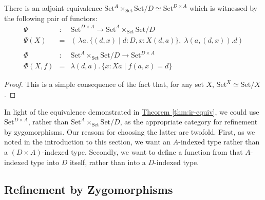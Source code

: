 \documentclass{LMCS}
\newcommand{\sepbar}{\mathrel|}
\newcommand{\Set}{\mathrm{Set}}
\newcommand{\thmref}[1]{\hyperref[#1]{Theorem \ref*{#1}}}
\begin{document}
\begin{thm}\label{thm:ir-equiv}
  There is an adjoint equivalence $\Set^A \times_\Set \Set/D \simeq
  \Set^{D \times A}$ which is witnessed by the following pair of
  functors:
\[\begin{array}{lll}
  \Psi & : & \Set^{D \times A} \to \Set^A \times_{\Set} \Set/D \\
  \Psi(X) & = & (\,\lambda a.\, \{ (d, x) \sepbar d : D, x : X (d,a) \},\; 
  \lambda (a, (d,x)).d)\\
  & & \\
  \Phi & : & \Set^A \times_{\Set} \Set/D \to \Set^{D \times A} \\
  \Phi(X,f) &=& \lambda(d,a).\, \{ x : X a \sepbar f (a,x) = d \}
  \end{array}\]
\end{thm}
\begin{proof}
  This is a simple consequence of the fact that, for any set $X$,
 $\Set^X \simeq \Set/X$.
\end{proof}
\noindent
In light of the equivalence demonstrated in \thmref{thm:ir-equiv}, we
could use $\Set^{D \times A}$, rather than $\Set^A \times_\Set
\Set/D$, as the appropriate category for refinement by
zygomorphisms. Our reasons for choosing the latter are twofold. First,
as we noted in the introduction to this section, we want an
$A$-indexed type rather than a $(D\times A)$-indexed type. Secondly,
we want to define a function from that $A$-indexed type into $D$
itself, rather than into a $D$-indexed type.

\subsection{Refinement by Zygomorphisms}\label{sec:zygo-refine-correct}
\end{document}

